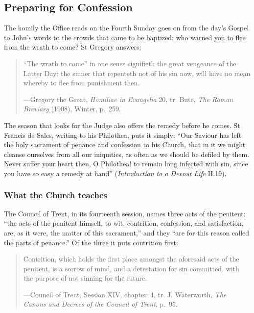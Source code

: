 \subsection{Preparing for Confession}\label{sec:confession}

The homily the Office reads on the Fourth Sunday goes on from the day's Gospel to John's words to
the crowds that came to be baptized: who warned you to flee from the wrath to come? St Gregory
answers:

\begin{quote}
``The wrath to come'' in one sense signifieth the great vengeance of the Latter Day: the sinner that
repenteth not of his sin now, will have no mean whereby to flee from punishment then.\par
{\smallskip\noindent\small ---Gregory the Great, \textit{Homiliae in Evangelia} 20, tr. Bute,
\textit{The Roman Breviary} (1908), Winter, p.~259.\par}
\end{quote}

\noindent The season that looks for the Judge also offers the remedy before he comes. St Francis de
Sales, writing to his Philothea, puts it simply: ``Our Saviour has left the holy
sacrament of penance and confession to his Church, that in it we might cleanse ourselves from all
our iniquities, as often as we should be defiled by them. Never suffer your heart then, O
Philothea! to remain long infected with sin, since you have so easy a remedy at hand''
(\textit{Introduction to a Devout Life} II.19).

\subsubsection{What the Church teaches}

The Council of Trent, in its fourteenth session, names three acts of the penitent: ``the acts of
the penitent himself, to wit, contrition, confession, and satisfaction, are, as it were, the matter
of this sacrament,'' and they ``are for this reason called the parts of penance.'' Of the three it
puts contrition first:

\begin{quote}
Contrition, which holds the first place amongst the aforesaid acts of the penitent, is a sorrow of
mind, and a detestation for sin committed, with the purpose of not sinning for the future.\par
{\smallskip\noindent\small ---Council of Trent, Session XIV, chapter~4, tr. J. Waterworth,
\textit{The Canons and Decrees of the Council of Trent}, p.~95.\par}
\end{quote}

